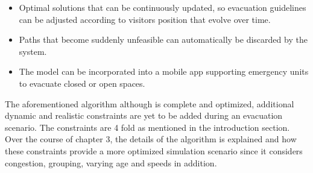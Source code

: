 \begin{itemize}
  \item Optimal solutions that can be continuously updated, so evacuation guidelines can be adjusted according to visitors position that evolve over time.
  \item Paths that become suddenly unfeasible can automatically be discarded by the system.
  \item The model can be incorporated into a mobile app supporting emergency units to evacuate closed or open spaces.
\end{itemize} 

The aforementioned algorithm although is complete and optimized, additional dynamic and realistic constraints are yet to be added during an evacuation scenario. The constraints are 4 fold as mentioned in the introduction section. Over the course of chapter 3, the details of the algorithm is explained and how these constraints provide a more optimized simulation scenario since it considers congestion, grouping, varying age and speeds in addition. 
